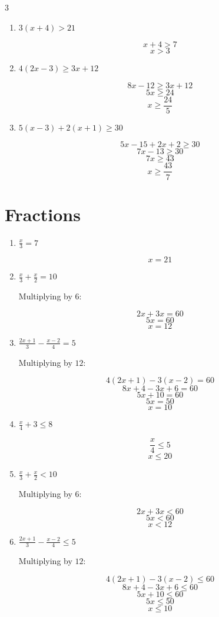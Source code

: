 \begin{multicols}{3}
\begin{enumerate}
			\[
			6x+10-4=4x+16
			\]
			\[
			6x+6=4x+16
			\]
			\[
			2x=10
			\]
			\[
			x=5
			\]
			
			\item
			$3(x+4)>21$
			
			\[
			x+4>7
			\]
			\[
			x>3
			\]
			
			\item
			$4(2x-3)\geq3x+12$
			
			\[
			8x-12\geq3x+12
			\]
			\[
			5x\geq24
			\]
			\[
			x\geq\frac{24}{5}
			\]
			
			\item
			$5(x-3)+2(x+1)\geq30$
			
			\[
			5x-15+2x+2\geq30
			\]
			\[
			7x-13\geq30
			\]
			\[
			7x\geq43
			\]
			\[
			x\geq\frac{43}{7}
			\]
		\end{enumerate}
		
		\columnbreak
		
		\section{Fractions}
		
		\begin{enumerate}
			\item
			$\frac{x}{3}=7$
			
			\[
			x=21
			\]
			
			\item
			$\frac{x}{3}+\frac{x}{2}=10$
			
			Multiplying by $6$:
			
			\[
			2x+3x=60
			\]
			\[
			5x=60
			\]
			\[
			x=12
			\]
			
			\item
			$\frac{2x+1}{3}-\frac{x-2}{4}=5$
			
			Multiplying by $12$:
			
			\[
			4(2x+1)-3(x-2)=60
			\]
			\[
			8x+4-3x+6=60
			\]
			\[
			5x+10=60
			\]
			\[
			5x=50
			\]
			\[
			x=10
			\]
			
			\item
			$\frac{x}{4}+3\leq8$
			
			\[
			\frac{x}{4}\leq5
			\]
			\[
			x\leq20
			\]
			
			\item
			$\frac{x}{3}+\frac{x}{2}<10$
			
			Multiplying by $6$:
			
			\[
			2x+3x<60
			\]
			\[
			5x<60
			\]
			\[
			x<12
			\]
			
			\item
			$\frac{2x+1}{3}-\frac{x-2}{4}\leq5$
			
			Multiplying by $12$:
			
			\[
			4(2x+1)-3(x-2)\leq60
			\]
			\[
			8x+4-3x+6\leq60
			\]
			\[
			5x+10\leq60
			\]
			\[
			5x\leq50
			\]
			\[
			x\leq10
			\]
		\end{enumerate}
		
	\end{multicols}
	
